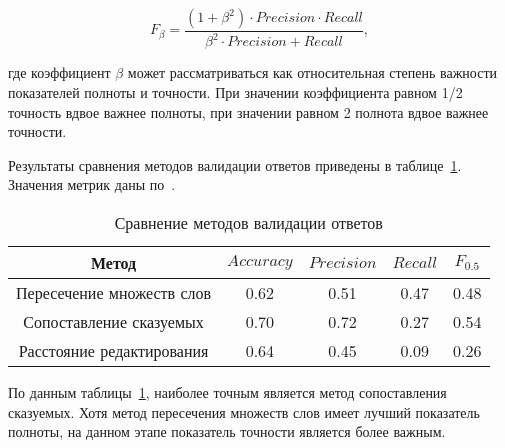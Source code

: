 \begin{equation}\label{eq:34}
	F_{\beta} = \frac{(1 + \beta^2) \cdot Precision \cdot Recall}{\beta^2 \cdot Precision + Recall},
\end{equation}

\noindent где коэффициент $\beta$ может рассматриваться как относительная степень важности показателей полноты и точности. При значении коэффициента равном 1/2 точность вдвое важнее полноты, при значении равном 2 полнота вдвое важнее точности.

Результаты сравнения методов валидации ответов приведены в таблице~\ref{tb:s42}. Значения метрик даны по~\cite{valid}.

\begin{table}[h!]
	\begin{center}
		\begin{threeparttable}
			\captionsetup{justification=raggedright,singlelinecheck=off}
			\caption{\label{tb:s42} Сравнение методов валидации ответов}
			\begin{tabular}{|c|c|c|c|c|}
				\hline
				Метод & $Accuracy$ & $Precision$ & $Recall$ & $F_{0.5}$ \\ [0.8ex] 
				\hline
				Пересечение множеств слов & 0.62 & 0.51 & 0.47 & 0.48 \\
				\hline
				Сопоставление сказуемых & 0.70 & 0.72 & 0.27 & 0.54 \\
				\hline
				Расстояние редактирования & 0.64 & 0.45 & 0.09 & 0.26 \\
				\hline
			\end{tabular}
		\end{threeparttable} 
	\end{center}
\end{table}

По данным таблицы~\ref{tb:s42}, наиболее точным является метод сопоставления сказуемых. Хотя метод пересечения множеств слов имеет лучший показатель полноты, на данном этапе показатель точности является более важным.


